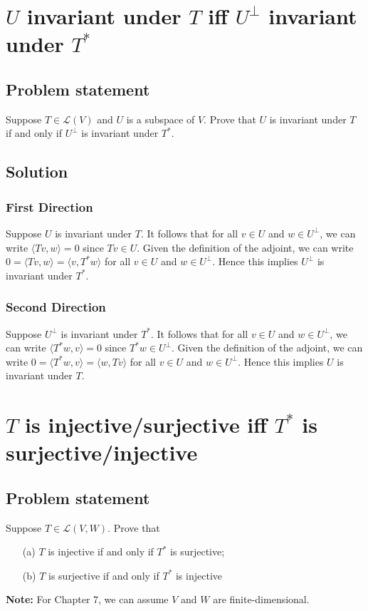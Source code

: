 \documentclass{article}
\begin{document}
\section{$U$ invariant under $T$ iff $U^\bot$ invariant under $T^*$}
\subsection*{Problem statement}
Suppose $T\in\mathcal{L}(V)$ and $U$ is a subspace of $V$. Prove that $U$ is invariant under $T$ if and only if $U^\bot$ is invariant under $T^*$.

\subsection*{Solution}
\subsubsection*{First Direction}
Suppose $U$ is invariant under $T$. It follows that for all $v\in U$ and $w\in U^\bot$, we can write $\langle Tv,w\rangle=0$ since $Tv\in U$. Given the definition of the adjoint, we can write $0=\langle Tv,w\rangle=\langle v,T^*w\rangle$ for all $v\in U$ and $w\in U^\bot$. Hence this implies $U^\bot$ is invariant under $T^*$.

\subsubsection*{Second Direction}
Suppose $U^\bot$ is invariant under $T^*$. It follows that for all $v\in U$ and $w\in U^\bot$, we can write $\langle T^* w,v\rangle=0$ since $T^* w\in U^\bot$. Given the definition of the adjoint, we can write $0=\langle T^* w,v\rangle=\langle w,Tv\rangle$ for all $v\in U$ and $w\in U^\bot$. Hence this implies $U$ is invariant under $T$.

\clearpage

\section{$T$ is injective/surjective iff $T^*$ is surjective/injective}
\subsection*{Problem statement}
Suppose $T\in\mathcal{L}(V,W)$. Prove that
\begin{enumerate}
  \item[(a)] $T$ is injective if and only if $T^*$ is surjective;
  \item[(b)] $T$ is surjective if and only if $T^*$ is injective
\end{enumerate}
\textbf{Note:} For Chapter 7, we can assume $V$ and $W$ are finite-dimensional.
\end{document}
